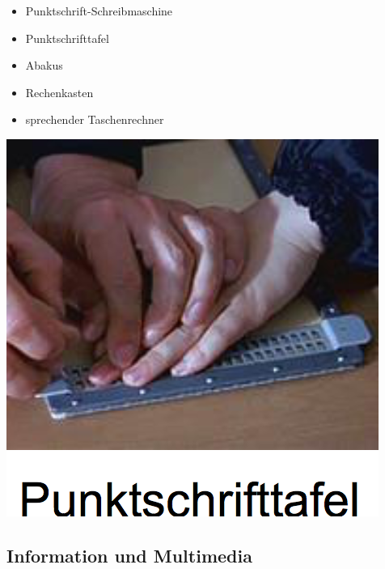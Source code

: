 \documentclass[paper=a4, fontsize=11pt]{scrartcl} %
\numberwithin{equation}{section} %
\numberwithin{figure}{section} %
\numberwithin{table}{section} %
\begin{document}
\begin{minipage}[c]{0.55\textwidth}
\begin{itemize}
\item Punktschrift-Schreibmaschine
\item Punktschrifttafel
\item Abakus
\item Rechenkasten
\item sprechender Taschenrechner
\end{itemize}
\end{minipage}
\begin{minipage}[c]{0.3\textwidth}
\includegraphics[width=\textwidth]{imgs/punktschrift}
\end{minipage}

\subsection{Information und Multimedia}
\end{document}

